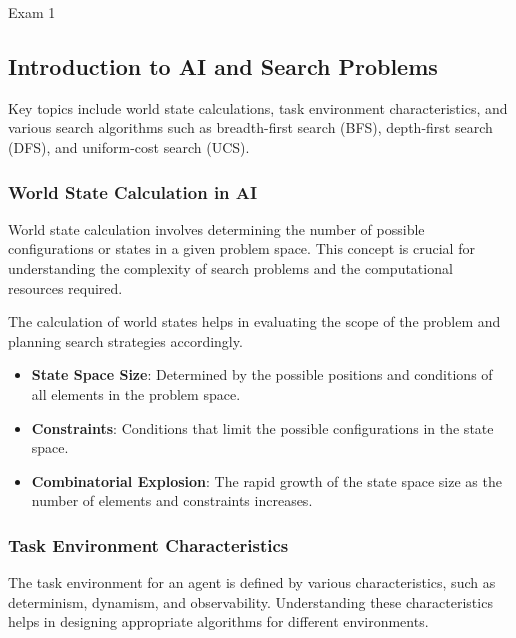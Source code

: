 \begin{examnotes}{Exam 1}
    \subsection*{Introduction to AI and Search Problems}

    Key topics include world state calculations, task environment characteristics, and various search algorithms such as breadth-first search (BFS), depth-first search (DFS), and uniform-cost search (UCS).
    
    \subsubsection*{World State Calculation in AI}
    
    World state calculation involves determining the number of possible configurations or states in a given problem space. This concept is crucial for understanding the complexity of search problems and the computational resources required.
    
    \begin{highlight}
        The calculation of world states helps in evaluating the scope of the problem and planning search strategies accordingly.
        
        \begin{itemize}
            \item \textbf{State Space Size}: Determined by the possible positions and conditions of all elements in the problem space.
            \item \textbf{Constraints}: Conditions that limit the possible configurations in the state space.
            \item \textbf{Combinatorial Explosion}: The rapid growth of the state space size as the number of elements and constraints increases.
        \end{itemize}
    \end{highlight}
    
    \subsubsection*{Task Environment Characteristics}
    
    The task environment for an agent is defined by various characteristics, such as determinism, dynamism, and observability. Understanding these characteristics helps in designing appropriate algorithms for different environments.
    

\end{examnotes}
